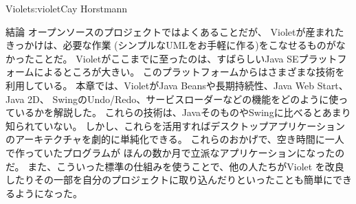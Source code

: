 \begin{aosachapter}{Violet}{s:violet}{Cay Horstmann}
\begin{aosasect1}{結論}
オープンソースのプロジェクトではよくあることだが、
Violetが産まれたきっかけは、必要な作業
(シンプルなUMLをお手軽に作る)をこなせるものがなかったことだ。
Violetがここまでに至ったのは、すばらしいJava SEプラットフォームによるところが大きい。
このプラットフォームからはさまざまな技術を利用している。
本章では、VioletがJava Beansや長期持続性、Java Web Start、Java 2D、
SwingのUndo/Redo、サービスローダーなどの機能をどのように使っているかを解説した。
これらの技術は、JavaそのものやSwingに比べるとあまり知られていない。
しかし、これらを活用すればデスクトップアプリケーションのアーキテクチャを劇的に単純化できる。
これらのおかげで、空き時間に一人で作っていたプログラムが
ほんの数か月で立派なアプリケーションになったのだ。
また、こういった標準の仕組みを使うことで、他の人たちがViolet
を改良したりその一部を自分のプロジェクトに取り込んだりといったことも簡単にできるようになった。

\end{aosasect1}

\end{aosachapter}
